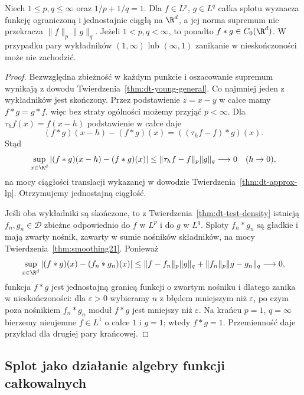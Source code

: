 \begin{twierdzenie}
\label{thm:dt-convolution-conjugate}
Niech $1\le p,q\le\infty$ oraz $1/p+1/q=1$.
Dla $f\in L^p$, $g\in L^q$ całka splotu wyznacza
funkcję ograniczoną i jednostajnie ciągłą na $\R^d$,
a jej norma supremum nie przekracza $\|f\|_p\|g\|_q$.
Jeżeli $1<p,q<\infty$, to ponadto $f*g\in C_0(\R^d)$.
W przypadku pary wykładników $(1,\infty)$ lub
$(\infty,1)$ zanikanie w nieskończoności może nie zachodzić.
\end{twierdzenie}
\begin{proof}
Bezwzględna zbieżność w każdym punkcie i oszacowanie
supremum wynikają z dowodu Twierdzenia~\ref{thm:dt-young-general}.
Co najmniej jeden z wykładników jest skończony.
Przez podstawienie $z=x-y$ w całce mamy $f*g=g*f$,
więc bez straty ogólności możemy przyjąć $p<\infty$.
Dla $\tau_h f(x)=f(x-h)$ podstawienie w całce daje
\[
 (f*g)(x-h)-(f*g)(x)=((\tau_h f-f)*g)(x).
\]
Stąd
\[
 \sup_{x\in\R^d}|(f*g)(x-h)-(f*g)(x)|
 \le\|\tau_h f-f\|_p\|g\|_q\longrightarrow0
 \quad(h\to0),
\]
na mocy ciągłości translacji wykazanej w dowodzie
Twierdzenia~\ref{thm:dt-approx-lp}.
Otrzymujemy jednostajną ciągłość.

Jeśli oba wykładniki są skończone, to z
Twierdzenia~\ref{thm:dt-test-density} istnieją
$f_n,g_n\in\mathcal D$ zbieżne odpowiednio do $f$ w $L^p$
i do $g$ w $L^q$. Sploty $f_n*g_n$ są gładkie i mają
zwarty nośnik, zawarty w sumie nośników składników,
na mocy Twierdzenia~\ref{thm:smoothing21}.
Ponieważ
\[
 \sup_{x\in\R^d}|(f*g)(x)-(f_n*g_n)(x)|
 \le\|f-f_n\|_p\|g\|_q+\|f_n\|_p\|g-g_n\|_q
 \longrightarrow0,
\]
funkcja $f*g$ jest jednostajną granicą funkcji o zwartym
nośniku i dlatego zanika w nieskończoności:
dla $\varepsilon>0$ wybieramy $n$ z błędem mniejszym
niż $\varepsilon$, po czym poza nośnikiem $f_n*g_n$
moduł $f*g$ jest mniejszy niż $\varepsilon$.
Na krańcu $p=1$, $q=\infty$ bierzemy nieujemne
$f\in L^1$ o całce $1$ i $g=1$; wtedy $f*g=1$.
Przemienność daje przykład dla drugiej pary krańcowej.
\end{proof}

\subsection{Splot jako działanie algebry funkcji całkowalnych}

